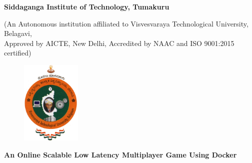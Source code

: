 
\begin{titlingpage}

\thispagestyle{empty}
\centering

\setlength{\toptafiddle}{1in}
\setlength{\bottafiddle}{1in}

\vspace*{-0.75in}
\enlargethispage{\toptafiddle}

\begin{LARGE}
\textbf{Siddaganga Institute of Technology, Tumakuru}\\
\end{LARGE}

\begin{small}

(An Autonomous institution affiliated to Visvesvaraya Technological University, Belagavi,\\ Approved by AICTE, New Delhi, Accredited by NAAC and ISO 9001:2015 certified)
\end{small}

\begin{figure}[h]
    \centering
    \includegraphics[height=4cm]{images/vtu.png}
\end{figure}

\vfill
\huge{\textbf{\textcolor{therablue}{An Online Scalable Low Latency Multiplayer Game Using Docker}}}\\
\vfill


\end{titlingpage}
